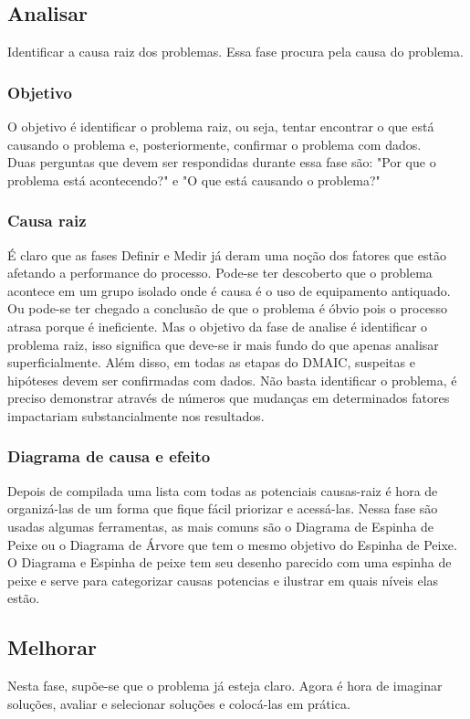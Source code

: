 \documentclass{abnt}
\begin{document}
				\subsection {Analisar}
					Identificar a causa raiz dos problemas. Essa fase procura pela causa do problema.
					\subsubsection {Objetivo}
					O objetivo é identificar o problema raiz, ou seja, tentar encontrar o que está causando o problema 
					e, posteriormente, confirmar o problema com dados.\\
					Duas perguntas que devem ser respondidas durante essa fase são: "Por que o problema está acontecendo?" e 
					"O que está causando o problema?"
					\subsubsection {Causa raiz}
					É claro que as fases Definir e Medir já deram uma noção dos fatores que estão afetando a performance do processo. 
					Pode-se ter descoberto que o problema acontece em um grupo isolado onde é causa é o uso de equipamento antiquado. 
					Ou pode-se ter chegado a conclusão de que o problema é óbvio pois o processo atrasa porque é ineficiente. 
					Mas o objetivo da fase de analise é identificar o problema raiz, isso significa que deve-se ir mais fundo 
					do que apenas analisar superficialmente. Além disso, em todas as etapas do DMAIC, suspeitas e 
					hipóteses devem ser confirmadas com dados. Não basta identificar o problema, é preciso demonstrar através de números 
					que mudanças em determinados fatores impactariam substancialmente nos resultados.
					\subsubsection {Diagrama de causa e efeito}
					Depois de compilada uma lista com todas as potenciais causas-raiz é hora de organizá-las de um forma que fique 
					fácil priorizar e acessá-las.
					Nessa fase são usadas algumas ferramentas, as mais comuns são o Diagrama de Espinha de Peixe ou o Diagrama de Árvore 
					que tem o mesmo objetivo do Espinha de Peixe.\\
					O Diagrama e Espinha de peixe tem seu desenho parecido com uma espinha de peixe e serve para 
					categorizar causas potencias e ilustrar em quais níveis elas estão.
				\subsection {Melhorar}
				Nesta fase, supõe-se que o problema já esteja claro. Agora é hora de imaginar soluções, avaliar e 
				selecionar soluções e colocá-las em prática.
\end{document}
